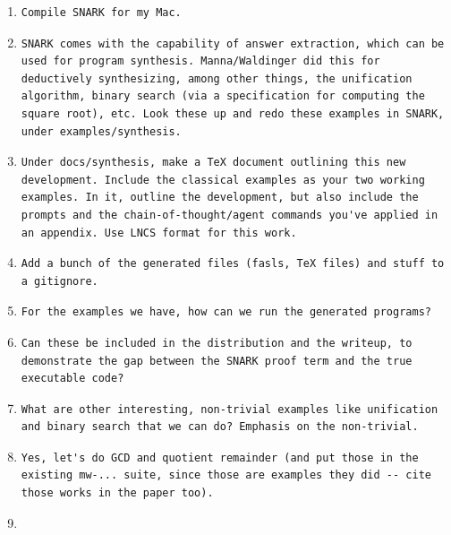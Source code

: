 \documentclass[runningheads]{llncs}
\begin{document}
\begin{enumerate}
\item
\begin{lstlisting}
Compile SNARK for my Mac.
\end{lstlisting}
\item
\begin{lstlisting}
SNARK comes with the capability of answer extraction, which can be used for program synthesis. Manna/Waldinger did this for deductively synthesizing, among other things, the unification algorithm, binary search (via a specification for computing the square root), etc. Look these up and redo these examples in SNARK, under examples/synthesis.
\end{lstlisting}
\item
\begin{lstlisting}
Under docs/synthesis, make a TeX document outlining this new development. Include the classical examples as your two working examples. In it, outline the development, but also include the prompts and the chain-of-thought/agent commands you've applied in an appendix. Use LNCS format for this work.
\end{lstlisting}
\item
\begin{lstlisting}
Add a bunch of the generated files (fasls, TeX files) and stuff to a gitignore.
\end{lstlisting}
\item
\begin{lstlisting}
For the examples we have, how can we run the generated programs?
\end{lstlisting}
\item
\begin{lstlisting}
Can these be included in the distribution and the writeup, to demonstrate the gap between the SNARK proof term and the true executable code?
\end{lstlisting}
\item
\begin{lstlisting}
What are other interesting, non-trivial examples like unification and binary search that we can do? Emphasis on the non-trivial.
\end{lstlisting}
\item
\begin{lstlisting}
Yes, let's do GCD and quotient remainder (and put those in the existing mw-... suite, since those are examples they did -- cite those works in the paper too).
\end{lstlisting}
\item

\end{enumerate}
\end{document}
